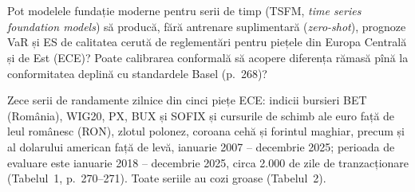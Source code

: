 \section{}
\textbf{} %
{Pot modelele fundație moderne pentru serii de timp (TSFM, \emph{time series foundation models}) să producă, fără antrenare suplimentară (\emph{zero-shot}), prognoze VaR și ES de calitatea cerută de reglementări pentru piețele din Europa Centrală și de Est (ECE)? Poate calibrarea conformală să acopere diferența rămasă pînă la conformitatea deplină cu standardele Basel (p.~268)?}

\textbf{} %
{Zece serii de randamente zilnice din cinci piețe ECE: indicii bursieri BET (România), WIG20, PX, BUX și SOFIX și cursurile de schimb ale euro față de leul românesc (RON), zlotul polonez, coroana cehă și forintul maghiar, precum și al dolarului american față de levă, ianuarie 2007 -- decembrie 2025; perioada de evaluare este ianuarie 2018 -- decembrie 2025, circa 2.000 de zile de tranzacționare (Tabelul~1, p.~270--271). Toate seriile au cozi groase (Tabelul~2).}

